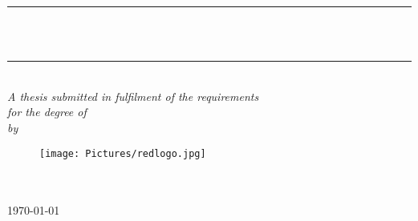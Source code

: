 \documentclass[11pt, a4paper, oneside]{Thesis} %
\title{\ttitle} %
\begin{document}
\makeatletter
\renewcommand*{\NAT@nmfmt}[1]{\textsc{#1}}
\makeatother



\frontmatter %


\fancyhead{} %
\rhead{\thepage} %
\lhead{} %

\pagestyle{fancy} %

\newcommand{\HRule}{\rule{\linewidth}{0.5mm}} %

\hypersetup{pdfsubject=\subjectname}
\hypersetup{pdfauthor=\authornames}
\hypersetup{pdfkeywords=\keywordnames}


\begin{titlepage}
\begin{center}

\HRule \\[0.4cm] %
{\huge \bfseries \ttitle}\\[0.4cm] %
\HRule \\[1.5cm] %
 
\large \textit{A thesis submitted in fulfilment of the requirements\\ for the degree of \degreename}\\[0.3cm] %
\textit{by}\\[0.4cm]%

\href{http://home.iitk.ac.in/~saiwal}{\authornames}

\vfill
\graphicspath{ {./Figures/} }
\begin{figure}[hb]
  \centering
  \texttt{[image: Pictures/redlogo.jpg]}
\end{figure}

\DEPTNAME\\ %
\textsc{ \UNIVNAME}\\[1.5cm] %
\large \today\\[2cm] %


\end{center}

\end{titlepage}
\end{document}
